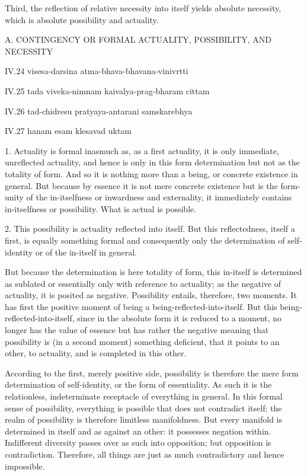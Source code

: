 Third, the reflection of relative necessity
into itself yields absolute necessity,
which is absolute possibility and actuality.

A. CONTINGENCY OR FORMAL ACTUALITY, POSSIBILITY, AND NECESSITY

IV.24
visesa-darsina atma-bhava-bhavana-vinivrtti

IV.25
tada viveka-nimnam kaivalya-prag-bharam cittam

IV.26
tad-chidresu pratyaya-antarani samskarebhya

IV.27
hanam esam klesavad uktam

1. Actuality is formal inasmuch as, as a first actuality,
it is only immediate, unreflected actuality,
and hence is only in this form determination
but not as the totality of form.
And so it is nothing more than a being,
or concrete existence in general.
But because by essence it is not mere concrete existence
but is the form-unity of the in-itselfness
or inwardness and externality,
it immediately contains in-itselfness or possibility.
What is actual is possible.

2. This possibility is actuality reflected into itself.
But this reflectedness, itself a first, is equally something formal
and consequently only the determination of self-identity
or of the in-itself in general.

But because the determination is here totality of form,
this in-itself is determined as sublated or essentially
only with reference to actuality;
as the negative of actuality, it is posited as negative.
Possibility entails, therefore, two moments.
It has first the positive moment of being a being-reflected-into-itself.
But this being-reflected-into-itself,
since in the absolute form it is reduced to a moment,
no longer has the value of essence but has rather
the negative meaning that possibility is (in a second moment)
something deficient, that it points to an other, to actuality,
and is completed in this other.

According to the first, merely positive side,
possibility is therefore the mere
form determination of self-identity,
or the form of essentiality.
As such it is the relationless, indeterminate
receptacle of everything in general.
In this formal sense of possibility,
everything is possible that does not contradict itself;
the realm of possibility is therefore limitless manifoldness.
But every manifold is determined in itself and as against an other:
it possesses negation within.
Indifferent diversity passes over as such into opposition;
but opposition is contradiction.
Therefore, all things are just as much contradictory
and hence impossible.

